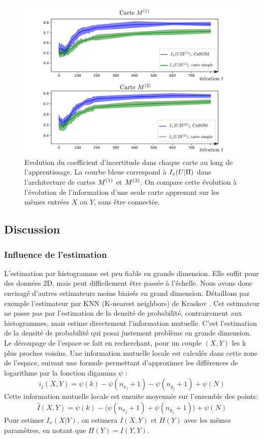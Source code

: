 \begin{figure}
\includegraphics[width=\textwidth]{evolution_MI_binning}
\caption{Evolution du coefficient d'incertitude dans chaque carte au long de l'apprentissage. La courbe bleue correspond à $I_x(U|\Pi)$ dans l'architecture de cartes $M^{({1})}$ et $M^{({2})}$. On compare cette évolution à l'évolution de l'information d'une seule carte apprenant sur les mêmes entrées $X$ ou $Y$, sans être connectée.}
\label{fig:MI_evol}
\end{figure}

\subsection{Discussion}

\subsubsection{Influence de l'estimation}
L'estimation par histogramme est peu fiable en grande dimension. Elle suffit pour des données 2D, mais peut difficilement être passée à l'échelle.
Nous avons donc envisagé d'autres estimateurs moins biaisés en grand dimension. Détaillons par exemple l'estimateur par KNN (K-nearest neighbors) de Kraskov \cite{2004kraskov}. 
Cet estimateur ne passe pas par l'estimation de la densité de probabilité, contrairement aux histogrammes, mais estime directement l'information mutuelle. C'est l'estimation de la densité de probabilité qui posai justement problème en grande dimension.
Le découpage de l'espace se fait en recherchant, pour un couple $(X,Y)$ les k plus proches voisins. Une information mutuelle locale est calculée dans cette zone de l'espace, suivant une formule permettant d'approximer les différences de logarithme par la fonction digamma $\psi$ : 
$$i_j(X,Y) = \psi(k) - \psi(n_{x_j} + 1) - \psi(n_{y_j} +1) + \psi(N)$$
Cette information mutuelle locale est ensuite moyennée sur l'ensemble des points: 
$$\hat{I}(X,Y) = \psi(k) - \langle\psi(n_{x_j} + 1) + \psi(n_{y_j} +1)\rangle + \psi(N)$$
Pour estimer $I_x(X|Y)$, on estimera $I(X,Y)$ et $H(Y)$ avec les mêmes paramètres, en notant que $H(Y) = I(Y,Y)$.

